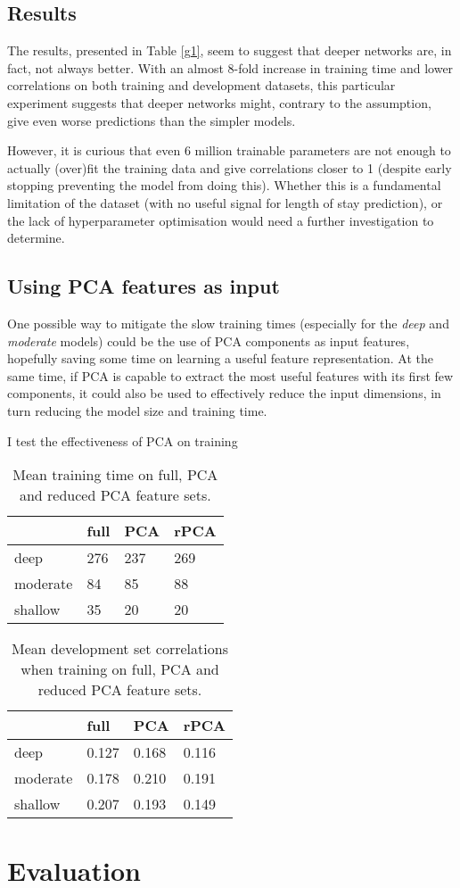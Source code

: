 \documentclass[10pt, twocolumn]{article}
\begin{document}
\subsection{Results}
The results, presented in Table \ref{g1}, seem to suggest that deeper networks are, in fact, not always better. With an almost 8-fold increase in training time and lower correlations on both training and development datasets, this particular experiment suggests that deeper networks might, contrary to the assumption, give even worse predictions than the simpler models. 

However, it is curious that even 6 million trainable parameters are not enough to actually (over)fit the training data and give correlations closer to 1 (despite early stopping preventing the model from doing this). Whether this is a fundamental limitation of the dataset (with no useful signal for length of stay prediction), or the lack of hyperparameter optimisation would need a further investigation to determine.

\subsection{Using PCA features as input}
One possible way to mitigate the slow training times (especially for the \textit{deep} and \textit{moderate} models) could be the use of PCA components as input features, hopefully saving some time on learning a useful feature representation. At the same time, if PCA is capable to extract the most useful features with its first few components, it could also be used to effectively reduce the input dimensions, in turn reducing the model size and training time. 

I test the effectiveness of PCA on training 

\begin{table}[]
	\begin{tabularx}{\linewidth}{XXXX}
		\hline
				& \textbf{full} & \textbf{PCA} & \textbf{rPCA}\\ \hline
		deep    & 276   & 237  & 269 \\
		moderate  & 84 & 85 & 88 \\
		shallow & 35 & 20 & 20
		\end{tabularx}
\caption{Mean training time on full, PCA and reduced PCA feature sets.}\label{g2}
\end{table}

\begin{table}[]
	\begin{tabularx}{\linewidth}{XXXX}
		\hline
				& \textbf{full} & \textbf{PCA} & \textbf{rPCA}\\ \hline
		deep    & 0.127   & 0.168  & 0.116 \\
		moderate  & 0.178 & 0.210 & 0.191 \\
		shallow & 0.207 & 0.193 & 0.149
		\end{tabularx}
\caption{Mean development set correlations when training on full, PCA and reduced PCA feature sets.}\label{g2}
\end{table}




\section{Evaluation}



\medskip
 


\end{document}
